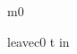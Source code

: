 \documentclass[12pt]{amsart}
\begin{document}
\begin{machine}{m0}
\begin{cschedule}{leave}{c0}
	t \in in
\end{cschedule}
%
%
%
%
%
%
%
%
%
%
%
%
%
%

\end{machine}
\end{document}
